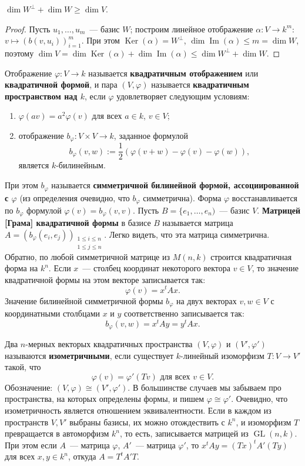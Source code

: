 \documentclass[a4paper,oneside,12pt]{article}
\theoremstyle{plain} { \swapnumbers
\newtheorem{theorem}{Теорема}[subsection]
\newtheorem{corollary}[theorem]{Следствие}
\newtheorem{lemma}[theorem]{Лемма}
\newtheorem{proposition}[theorem]{Утверждение}
\newtheorem{claim}[theorem]{Факт}
}
\theoremstyle{definition} { \swapnumbers
\newtheorem{definition}[theorem]{Определение}
\newtheorem{notation}[theorem]{Обозначение}
\newtheorem{remark}[theorem]{Замечание}
\newtheorem{remarks}[theorem]{Замечания}
\newtheorem{example}[theorem]{Пример}
\newtheorem{examples}[theorem]{Примеры}
\newtheorem{sssection}[theorem]{}
}
\def\ph{\varphi}
\def\GL{\operatorname{GL}}
\def\Ker{\operatorname{Ker}}
\def\Image{\operatorname{Im}}
\def\a{\alpha}
\begin{document}
\begin{lemma}\label{lemma:dimension_of_orthogonal}
$\dim W^\perp+\dim W\geq\dim V$.
\end{lemma}
\begin{proof}
Пусть $u_1,\dots,u_m$~--- базис $W$; построим линейное отображение $\a\colon V\to k^m$: $v\mapsto(b(v,u_i))_{i=1}^m$.
При этом $\Ker(\a)=W^\perp$, $\dim\Image(\a)\leq m=\dim W$, поэтому $\dim V=\dim\Ker(\a)+\dim\Image(\a)
\leq\dim W^\perp+\dim W$.
\end{proof}

Отображение
$\ph\colon V\to k$ называется {\bf квадратичным отображением} или
{\bf квадратичной формой},
и пара $(V,\ph)$ называется {\bf квадратичным пространством над $k$},
если $\ph$ удовлетворяет следующим условиям:
\begin{enumerate}
\item $\ph(av)=a^2\ph(v)$ для всех $a\in k$, $v\in V$;
\item отображение $b_\ph\colon V\times V\to k$, заданное формулой
$$
b_\ph(v,w):=\frac12(\ph(v+w)-\ph(v)-\ph(w)),
$$
является $k$-билинейным.
\end{enumerate}
При этом $b_\ph$ называется {\bf симметричной билинейной формой, ассоциированной с $\ph$}
(из определения очевидно, что $b_\ph$ симметрична).
Форма $\ph$ восстанавливается по $b_\ph$ формулой $\ph(v)=b_\ph(v,v)$.
Пусть $B=\{e_1,\dots,e_n)$~--- базис $V$. {\bf Матрицей [Грама] квадратичной формы} в базисе $B$
называется матрица $A=(b_\ph(e_i,e_j))_{\begin{smallmatrix}1\leq i\leq n\\1\leq j\leq n\end{smallmatrix}}$.
Легко видеть, что эта матрица симметрична. Обратно, по любой симметричной матрице из $M(n,k)$
строится квадратичная форма на $k^n$.
Если $x$~--- столбец координат некоторого вектора $v\in V$, то значение квадратичной формы на этом
векторе записывается так:
$$
\ph(v)=x^tAx.
$$
Значение билинейной симметричной формы $b_\ph$ на двух векторах $v,w\in V$ с координатными столбцами
$x$ и $y$ соответственно записывается так:
$$
b_\ph(v,w)=x^tAy=y^tAx.
$$

Два $n$-мерных векторых квадратичных пространства $(V,\ph)$ и $(V',\ph')$ называются
{\bf изометричными}, если существует $k$-линейный изоморфизм $T\colon V\to V'$
такой, что
$$
\ph(v)=\ph'(Tv)\text{ для всех $v\in V$.}
$$
Обозначение: $(V,\ph)\cong(V',\ph')$. В большинстве случаев мы забываем про пространства,
на которых определены формы, и пишем $\ph\cong\ph'$.
Очевидно, что изометричность является отношением эквивалентности.
Если в каждом из пространств $V,V'$ выбраны базисы, их можно отождествить с $k^n$,
и изоморфизм $T$ превращается в автоморфизм $k^n$, то есть, записывается
матрицей из $\GL(n,k)$. При этом если $A$~--- матрица $\ph$, $A'$~--- матрица $\ph'$,
то $x^tAy=(Tx)^tA'(Ty)$ для всех $x,y\in k^n$, откуда $A=T^tA'T$.
\end{document}
